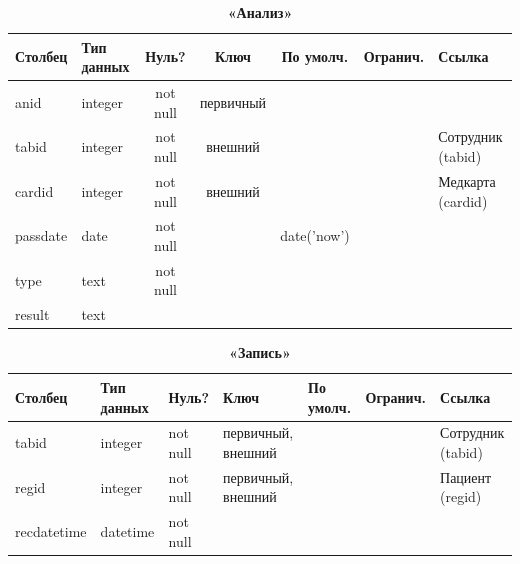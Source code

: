 \documentclass[14pt,a4paper,russian]{extreport}
\begin{document}
\begin{table}[h]
    \caption{ } 
    \begin{subtable}[t]{\textwidth}
        \caption{\textbf{«Анализ»}}
    \begin{tabularx}{\textwidth}{| X | X | c | c | c | c | X |}
        \hline
        \textbf{Столбец} & \textbf{Тип данных} & \textbf{Нуль?} & \textbf{Ключ} & \textbf{По
        умолч.} & \textbf{Огранич.} & \textbf{Ссылка} \\ \hline
        anid & integer & not null & первичный & & & \\ \hline
        tabid & integer & not null & внешний & & & Сотрудник (tabid) \\ \hline
        cardid & integer & not null & внешний & & & Медкарта (cardid) \\ \hline
        passdate & date & not null & & date('now') & & \\ \hline
        type & text & not null & & & & \\ \hline
        result & text & & & & & \\ \hline
    \end{tabularx}
    \end{subtable}
    \label{table:analysis}
\end{table}

\begin{table}[h]
    \caption{ } 
    \begin{subtable}[t]{\textwidth}
        \caption{\textbf{«Запись»}}
    \begin{tabularx}{\textwidth}{| X | X | X | X | X | X | X |}
        \hline
        \textbf{Столбец} & \textbf{Тип данных} & \textbf{Нуль?} & \textbf{Ключ} & \textbf{По
        умолч.} & \textbf{Огранич.} & \textbf{Ссылка} \\ \hline
        tabid & integer & not null & первичный, внешний & & & Сотрудник (tabid) \\ \hline
        regid & integer & not null & первичный, внешний & & & Пациент (regid)  \\ \hline
        recdatetime & datetime & not null & & & & \\ \hline
    \end{tabularx}
    \end{subtable}
    \label{table:rec}
\end{table}
\end{document}

